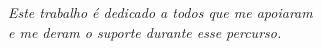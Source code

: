 \begin{dedicatoria}
   \vspace*{\fill}
   \centering
   \noindent
   \textit{Este trabalho é dedicado a todos que me apoiaram\\
   e me deram o suporte durante esse percurso.} \vspace*{\fill}
\end{dedicatoria}
